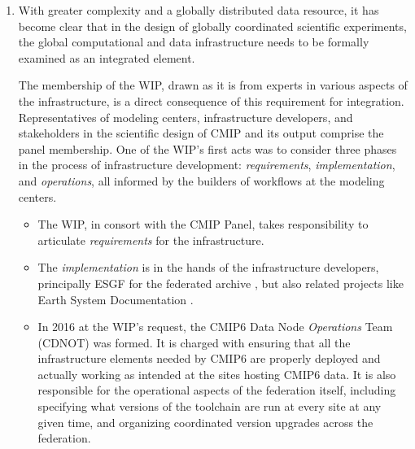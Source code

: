 \documentclass[gmd,manuscript]{copernicus}
\newcommand{\urlref}[2] {\href{#1}{#2}\footnote{\url{#1}, retrieved \today.}}
\begin{document}
\begin{enumerate}
\item With greater complexity and a globally distributed data
  resource, it has become clear that in the design of globally
  coordinated scientific experiments, the global computational and
  data infrastructure needs to be formally examined as an integrated
  element.
  
  The membership of the WIP, drawn as it is from experts in various
  aspects of the infrastructure, is a direct consequence of this
  requirement for integration. Representatives of modeling centers,
  infrastructure developers, and stakeholders in the scientific design
  of CMIP and its output comprise the panel membership. One of the
  WIP's first acts was to consider three phases in the process of
  infrastructure development: \emph{requirements},
  \emph{implementation}, and \emph{operations}, all informed by the
  builders of workflows at the modeling centers.
    
  \begin{itemize}
  \item The WIP, in consort with the CMIP Panel, takes responsibility
    to articulate \emph{requirements} for the infrastructure.
  \item The \emph{implementation} is in the hands of the
    infrastructure developers, principally ESGF for the federated
    archive \citep{ref:williamsetal2015}, but also related projects
    like Earth System Documentation
    \citep[\urlref{https://goo.gl/WNwKD9}{ES-DOC},][]{ref:guilyardietal2013}.
  \item In 2016 at the WIP's request, the CMIP6 Data Node
    \emph{Operations} Team (CDNOT) was formed.
    It is charged with ensuring that all the infrastructure elements
    needed by CMIP6 are properly deployed and actually working as
    intended at the sites hosting CMIP6 data. It is also responsible
    for the operational aspects of the federation itself, including
    specifying what versions of the toolchain are run at every site at
    any given time, and organizing coordinated version upgrades across
    the federation.
  \end{itemize}


\end{enumerate}
\end{document}
